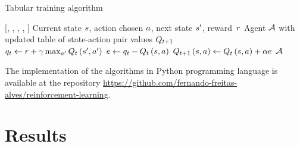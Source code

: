 \documentclass[conference]{IEEEtran}
\begin{document}
\begin{algorithm}[t]
    \caption{Tabular {\Qlearning} training algorithm}
    \begin{algorithmic}[1]
        [\agent, \state, \action, \nextstate, \reward]
        \INPUT      Current state $s$, action chosen $a$, next state $s^{\prime}$, \mbox{reward $r$}
        \OUTPUT     Agent $\mathcal{A}$ with updated table of state-action pair values $\nextQtarget$
        \\
        \STATE $ \qtarget \gets \reward + \discountfactor \max_{\nextaction}{\nextQftarget} $
        \STATE $ \error \gets \qtarget - \Qftarget $
        \STATE $ \nextQtarget\Qargs \gets \Qftarget + \learningrate \error $
        \RETURN $\mathcal{A}$
    \end{algorithmic}
    \label{qlearning}
\end{algorithm}

The implementation of the algorithms in Python programming language is available at the repository \url{https://github.com/fernando-freitas-alves/reinforcement-learning}.



\section{Results}
\end{document}
